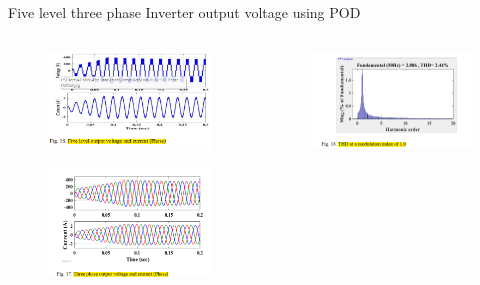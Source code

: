 \documentclass[
	11pt, %
]{beamer}
\begin{document}
\begin{frame}{Five level three phase Inverter output voltage using POD}
	\begin{columns}	
	\begin{column}{0.5\textwidth}
		\begin{figure}
			\includegraphics[width=0.8\linewidth]{POD_V_C.png}
		\end{figure}
		\begin{figure}
			\includegraphics[width=0.8\linewidth]{POD_V_C_3.png}
		\end{figure}
	\end{column}
	\begin{column}{0.5\textwidth}
		\begin{figure}
			\includegraphics[width=1\linewidth]{POD_THD.png}

\end{figure}
\end{column}
\end{columns}
\end{frame}
\end{document}
